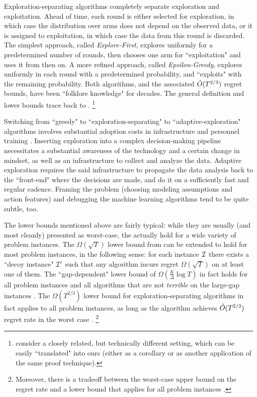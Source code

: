 Exploration-separating algorithms completely separate exploration and exploitation. Ahead of time, each round is either selected for exploration, in which case  the distribution over arms does not depend on the observed data, or it is assigned to exploitation, in which case the data from this round is discarded. The simplest approach, called \emph{Explore-First}, explores uniformly for a predetermined number of rounds, then chooses one arm for ``exploitation" and uses it from then on. A more refined approach, called \emph{Epsilon-Greedy}, explores uniformly in each round with a predetermined probability, and ``exploits" with the remaining probability. Both algorithms, and the associated $\tilde{O}(T^{2/3})$ regret bounds, have been ``folklore knowledge" for decades. The general definition and lower bounds trace back to \citet{MechMAB-ec09}.%
\footnote{\citet{MechMAB-ec09} consider a closely related, but technically different setting, which can be easily ``translated" into ours (either as a corollary or as another application of the same proof technique).}


Switching from ``greedy" to ``exploration-separating" to ``adaptive-exploration" algorithms involves substantial adoption costs in infrastructure and personnel training \citep{DS-arxiv}. Inserting exploration into a complex decision-making pipeline necessitates a substantial awareness of the technology and a certain change in mindset, as well as an infrastructure to collect and analyze the data. Adaptive exploration requires the said infrastructure to propagate the data analysis back to the ``front-end" where the decisions are made, and do it on a sufficiently fast and regular cadence. Framing the problem (\eg choosing modeling assumptions and action features) and debugging the machine learning algorithms tend to be quite subtle, too.

The lower bounds mentioned above are fairly typical: while they are usually (and most cleanly) presented as worst-case, the actually hold for a wide variety of problem instances. The $\Omega(\sqrt{T})$ lower bound from \citet{bandits-exp3} can be extended to hold for most problem instances, in the following sense: for each instance $\mathcal{I}$ there exists a ``decoy instance" $\mathcal{I}'$ such that any algorithm incurs regret $\Omega(\sqrt{T})$ on at least one of them. The ``gap-dependent" lower bound of
 $\Omega(\tfrac{K}{\Delta}\log T)$
in fact holds for all problem instances and all algorithms that are not \emph{terrible} on the large-gap instances \citep{Lai-Robbins-85}. The $\Omega(T^{2/3})$ lower bound for exploration-separating algorithms in fact applies to all problem instances, as long as the algorithm achieves $\tilde{O}(T^{2/3})$ regret rate in the worst case \citep{MechMAB-ec09}.%
\footnote{Moreover, there is a tradeoff between the worst-case upper bound on the regret rate and a lower bound that applies for all problem instances \citep[Theorem 4.3 in][]{MechMAB-ec09}.}

